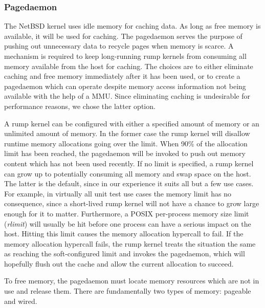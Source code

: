 \subsubsection{Pagedaemon}

The NetBSD kernel uses idle memory for caching data.  As long as
free memory is available, it will be used for caching.  The pagedaemon
serves the purpose of pushing out unnecessary data to recycle pages
when memory is scarce.  A mechanism is required to keep long-running
rump kernels from consuming all memory available from the host for
caching.  The choices are to either eliminate caching and free
memory immediately after it has been used, or to create a pagedaemon
which can operate despite memory access information not being
available with the help of a MMU.  Since eliminating caching is
undesirable for performance reasons, we chose the latter option.

A rump kernel can be configured with either a specified amount of memory
or an unlimited amount of memory.  In the former case the rump
kernel will disallow runtime memory allocations going over the
limit.  When 90\% of the allocation limit has been reached, the
pagedaemon will be invoked to push out memory content which has
not been used recently.  If no limit is specified, a rump kernel
can grow up to potentially consuming all memory and swap space on
the host.  The latter is the default, since in our experience it
suits all but a few use cases.  For example, in virtually all unit
test use cases the memory limit has no consequence, since a
short-lived rump kernel will not have a chance to grow large enough
for it to matter.  Furthermore, a POSIX per-process memory size
limit (\textit{rlimit}) will usually be hit before one process can
have a serious impact on the host.  Hitting this limit causes the memory
allocation hypercall to fail.  If the memory allocation hypercall
fails, the rump kernel treats the situation the same as reaching the
soft-configured limit and invokes the pagedaemon, which will hopefully
flush out the cache and allow the current allocation to succeed.

To free memory, the pagedaemon must locate memory resources which
are not in use and release them.  There are fundamentally two types
of memory: pageable and wired.

